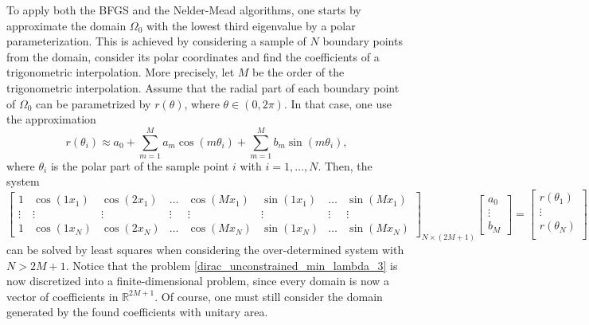 To apply both the \ac{BFGS} and the Nelder-Mead algorithms, one starts by approximate the domain \(\Omega_0\) with the lowest third eigenvalue by a polar parameterization. This is achieved by considering a sample of \(N\) boundary points from the domain, consider its polar coordinates and find the coefficients of a trigonometric interpolation. More precisely, let \(M\) be the order of the trigonometric interpolation. Assume that the radial part of each boundary point of \(\Omega_0\) can be parametrized by \(r(\theta)\), where \(\theta \in (0, 2\pi)\). In that case, one use the approximation
\[
    r(\theta_i) \approx a_0 + \sum_{m=1}^{M}a_m \cos(m \theta_i) + \sum_{m=1}^{M}b_m \sin(m \theta_i),
\]
where \(\theta_i\) is the polar part of the sample point \(i\) with \(i=1,\dots,N\). Then, the system
\[
    \begin{bmatrix}
        1 & \cos(1 x_1) & \cos(2 x_1) & \dots & \cos(M x_1) & \sin(1 x_1) & \dots & \sin(M x_1)\\
        \vdots & \vdots & \vdots & \vdots & \vdots & \vdots & \vdots & \vdots\\
        1 & \cos(1 x_N) & \cos(2 x_N) & \dots & \cos(M x_N) & \sin(1 x_N) & \dots & \sin(M x_N)
    \end{bmatrix}_{N\times(2M+1)}
    \begin{bmatrix}
        a_0\\
        \vdots\\
        b_M
    \end{bmatrix}
    =
    \begin{bmatrix}
        r(\theta_1)\\
        \vdots\\
        r(\theta_N)\\
    \end{bmatrix}
\]
can be solved by least squares when considering the over-determined system with \(N > 2M+1\). Notice that the problem \eqref{dirac_unconstrained_min_lambda_3} is now discretized into a finite-dimensional problem, since every domain is now a vector of coefficients in \(\mathbb{R}^{2M+1}\). Of course, one must still consider the domain generated by the found coefficients with unitary area.

